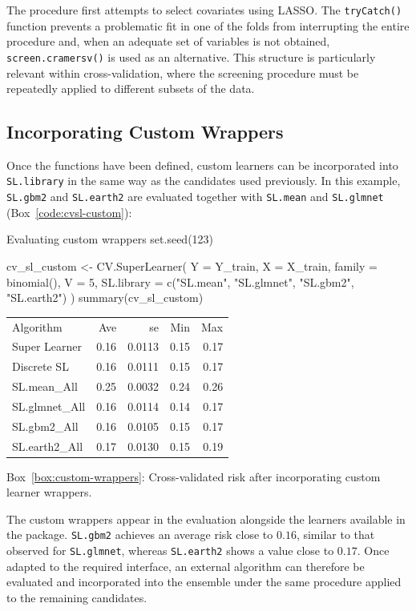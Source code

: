 \documentclass[12pt]{article}
\newcommand{\routputcaption}[2]{%
    \par\smallskip
    \begin{center}
        Box~\ref{#1}: #2
    \end{center}
}
\begin{document}
The procedure first attempts to select covariates using LASSO. The \texttt{tryCatch()} function prevents a problematic fit in one of the folds from interrupting the entire procedure and, when an adequate set of variables is not obtained, \texttt{screen.cramersv()} is used as an alternative. This structure is particularly relevant within cross-validation, where the screening procedure must be repeatedly applied to different subsets of the data.

\subsection{Incorporating Custom Wrappers}

Once the functions have been defined, custom learners can be incorporated into \texttt{SL.library} in the same way as the candidates used previously. In this example, \texttt{SL.gbm2} and \texttt{SL.earth2} are evaluated together with \texttt{SL.mean} and \texttt{SL.glmnet} (Box~\ref{code:cvsl-custom}):

\begin{rcode}[label={code:cvsl-custom}]{Evaluating custom wrappers}
	set.seed(123)
	
	cv_sl_custom <- CV.SuperLearner(
	Y = Y_train, X = X_train,
	family = binomial(), V = 5,
	SL.library = c("SL.mean", "SL.glmnet", "SL.gbm2", "SL.earth2")
	)
	summary(cv_sl_custom)
\end{rcode}

\begin{routputboxref}[label={box:custom-wrappers}]
	\ttfamily
	\centering
	\begin{tabular}{lrrrr}
		Algorithm & Ave & se & Min & Max \\
		Super Learner & 0.16 & 0.0113 & 0.15 & 0.17 \\
		Discrete SL & 0.16 & 0.0111 & 0.15 & 0.17 \\
		SL.mean\_All & 0.25 & 0.0032 & 0.24 & 0.26 \\
		SL.glmnet\_All & 0.16 & 0.0114 & 0.14 & 0.17 \\
		SL.gbm2\_All & 0.16 & 0.0105 & 0.15 & 0.17 \\
		SL.earth2\_All & 0.17 & 0.0130 & 0.15 & 0.19 \\
	\end{tabular}
\end{routputboxref}

\routputcaption{box:custom-wrappers}
{Cross-validated risk after incorporating custom learner wrappers.}

The custom wrappers appear in the evaluation alongside the learners available in the package. \texttt{SL.gbm2} achieves an average risk close to $0.16$, similar to that observed for \texttt{SL.glmnet}, whereas \texttt{SL.earth2} shows a value close to $0.17$. Once adapted to the required interface, an external algorithm can therefore be evaluated and incorporated into the ensemble under the same procedure applied to the remaining candidates.



\newpage


\end{document}
